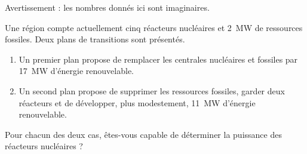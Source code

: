 
Avertissement : les nombres donnés ici sont imaginaires.

Une région compte actuellement cinq réacteurs nucléaires et \SI{2}{\mega\watt} de ressources fossiles. Deux plans de transitions sont présentés.
\begin{enumerate}
    \item
        Un premier plan propose de remplacer les centrales nucléaires et fossiles par \SI{17}{\mega\watt} d'énergie renouvelable.
    \item
        Un second plan propose de supprimer les ressources fossiles, garder deux réacteurs et de développer, plus modestement, \SI{11}{\mega\watt} d'énergie renouvelable.
\end{enumerate}

Pour chacun des deux cas, êtes-vous capable de déterminer la puissance des réacteurs nucléaires ?
